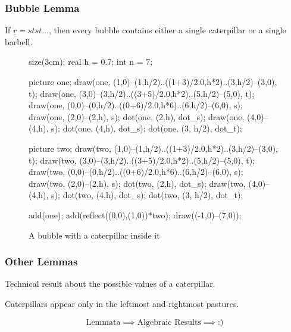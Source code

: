 \documentclass[pdf]{beamer}
\def\ul#1{\underline{#1}}
\begin{document}
\begin{frame}[fragile]
	\frametitle{Bubble Lemma}
	\begin{lemma}
		If $\ul r = stst\dots$, then
		every bubble contains either a single caterpillar or a single barbell.
	\end{lemma}
	\begin{figure}[ht]
		\centering
		\begin{asy}
		size(3cm);
		real h = 0.7;
		int n = 7;

		picture one;
		draw(one, (1,0)--(1,h/2)..((1+3)/2.0,h*2)..(3,h/2)--(3,0), t);
		draw(one, (3,0)--(3,h/2)..((3+5)/2.0,h*2)..(5,h/2)--(5,0), t);
		draw(one, (0,0)--(0,h/2)..((0+6)/2.0,h*6)..(6,h/2)--(6,0), s);
		draw(one, (2,0)--(2,h), s);
		dot(one, (2,h), dot_s);
		draw(one, (4,0)--(4,h), s);
		dot(one, (4,h), dot_s);
		dot(one, (3, h/2), dot_t);

		picture two;
		draw(two, (1,0)--(1,h/2)..((1+3)/2.0,h*2)..(3,h/2)--(3,0), t);
		draw(two, (3,0)--(3,h/2)..((3+5)/2.0,h*2)..(5,h/2)--(5,0), t);
		draw(two, (0,0)--(0,h/2)..((0+6)/2.0,h*6)..(6,h/2)--(6,0), s);
		draw(two, (2,0)--(2,h), s);
		dot(two, (2,h), dot_s);
		draw(two, (4,0)--(4,h), s);
		dot(two, (4,h), dot_s);
		dot(two, (3, h/2), dot_t);

		add(one); add(reflect((0,0),(1,0))*two);
		draw((-1,0)--(7,0));
		\end{asy}
		\caption{A bubble with a caterpillar inside it}
	\end{figure}
\end{frame}

\begin{frame}
	\frametitle{Other Lemmas}
	\begin{lemma}
		Technical result about the possible values of a caterpillar.
	\end{lemma}
	\pause
	\begin{lemma}
		Caterpillars appear only in the leftmost and rightmost pastures.
	\end{lemma}
	\pause
	\[ \text{Lemmata} \implies \text{Algebraic Results} \implies \text{:)} \]
\end{frame}
\end{document}
